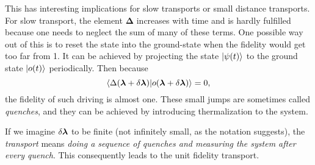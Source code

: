 This has interesting implications for slow transports or small distance transports. For slow transport, the element $\bm\Delta$ increases with time and is hardly fulfilled because one needs to neglect the sum of many of these terms. One possible way out of this is to reset the state into the ground-state when the fidelity would get too far from 1. It can be achieved by projecting the state $\ket{\psi(t)}$ to the ground state $\ket{o(t)}$ periodically. Then because
$$\braket{\Delta({\bm\lambda}+\delta{\bm\lambda})|o({\bm\lambda}+\delta{\bm\lambda})}= 0,$$
the fidelity of such driving is almost one. These small jumps are sometimes called \emph{quenches}, and they can be achieved by introducing thermalization to the system.






If we imagine $\delta{\bm\lambda}$ to be finite (not infinitely small, as the notation suggests), the \emph{transport} means \emph{doing a sequence of quenches and measuring the system after every quench}. This consequently leads to the unit fidelity transport.













